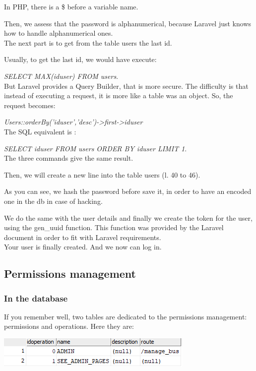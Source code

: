 \documentclass[12pt,a4paper,openany]{book}
\begin{document}
\begin{remarque}
	In PHP, there is a \$ before a variable name.
\end{remarque}
Then, we assess that the password is alphanumerical, because Laravel just knows how to handle alphanumerical ones.\\

The next part is to get from the table users the last id.

\begin{remarque}
	Usually, to get the last id, we would have execute:
	
	\emph{SELECT MAX(iduser) FROM users}.\\
	But Laravel provides a Query Builder, that is more secure. The difficulty is that instead of executing a request, it is more like a table was an object. So, the request becomes:
	
	\emph{Users::orderBy('iduser','desc')->first->iduser}\\
	The SQL equivalent is :
	
	\emph{SELECT iduser FROM users ORDER BY iduser LIMIT 1}.\\
	The three commands give the same result.
\end{remarque}	
Then, we will create a new line into the table users (l. 40 to 46).

\begin{remarque}
	As you can see, we hash the password before save it, in order to have an encoded one in the db in case of hacking.
\end{remarque}
We do the same with the user details and finally we create the token for the user, using the gen\_uuid function. This function was provided by the Laravel document in order to fit with Laravel requirements.\\

Your user is finally created. And we now can log in.

\subsection{Permissions management}
\subsubsection{In the database}
If you remember well, two tables are dedicated to the permissions management: permissions and operations. Here they are:

\begin{center}
\includegraphics[scale=1]{Figs/fig6}
\end{center}
\end{document}
